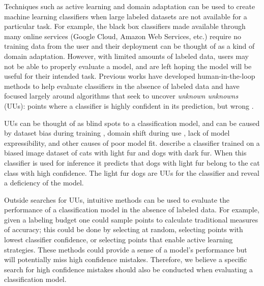 \documentclass[conference]{IEEEtran}
\begin{document}
Techniques such as active learning \citep{Settles2010} and domain adaptation \citep{Patel2014} can be used to create machine learning classifiers when large labeled datasets are not available for a particular task. For example, the black box classifiers made available through many online services (Google Cloud, Amazon Web Services, etc.) require no training data from the user and their deployment can be thought of as a kind of domain adaptation.  However, with limited amounts of labeled data, users may not be able to properly evaluate a model, and are left hoping the model will be useful for their intended task. Previous works have developed human-in-the-loop methods to help evaluate classifiers in the absence of labeled data and have focused largely around algorithms that seek to uncover \textit{unknown unknowns} (UUs): points where a classifier is highly confident in its prediction, but wrong \citep{Attenberg2015}. 

UUs can be thought of as blind spots to a classification model, and can be caused by dataset bias during training \citep{stock2017convnets}, domain shift during use \citep{sugiyama2017dataset}, lack of model expressibility, and other causes of poor model fit. \citet{Lakkaraju2016} describe a classifier trained on a biased image dataset of cats with light fur and dogs with dark fur. When this classifier is used for inference it predicts that dogs with light fur belong to the cat class with high confidence.  The light fur dogs are UUs for the classifier and reveal a deficiency of the model.  


Outside searches for UUs, intuitive methods can be used to evaluate the performance of a classification model in the absence of labeled data. For example, given a labeling budget one could sample points to calculate traditional measures of accuracy; this could be done by selecting at random, selecting points with lowest classifier confidence, or selecting points that enable active learning strategies.  These methods could provide a sense of a model's performance but will potentially miss high confidence mistakes. Therefore, we believe a specific search for high confidence mistakes should also be conducted when evaluating a classification model.
\end{document}
